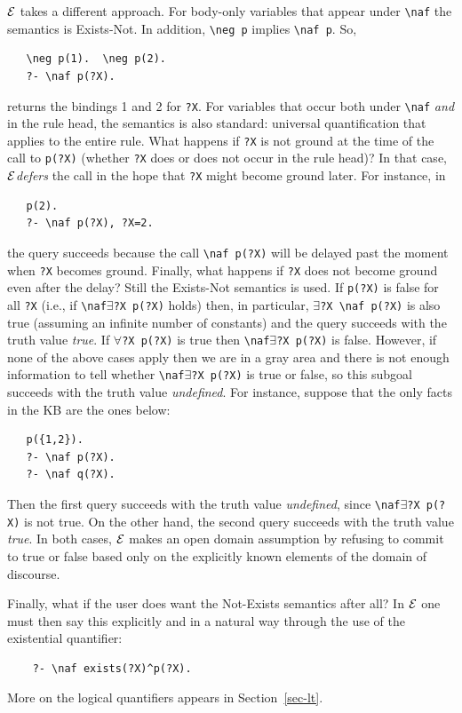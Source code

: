 \documentclass[11pt]{article}
\newcommand{\ERGO}{\mbox{\ensuremath{\cal{E}}\smaller{{\sc{RGO}}}}\xspace}
\newcommand{\FLSYSTEM}{\ERGO}
\newcommand{\bs}{\textbackslash}
\newcommand{\RULELOGNAF}{{\texttt{{\bs}naf}}\xspace}
\newcommand{\RULELOGNEG}{{\texttt{{\bs}neg}}\xspace}
\begin{document}
\FLSYSTEM takes a different approach. For body-only variables that appear
under \texttt{\RULELOGNAF} the semantics is Exists-Not. In addition, \texttt{\RULELOGNEG p}
implies \texttt{\RULELOGNAF p}. So,
\begin{verbatim}
   \neg p(1).  \neg p(2).
   ?- \naf p(?X).
\end{verbatim}
returns the bindings 1 and 2 for \texttt{?X}. For variables that occur both
under \texttt{\RULELOGNAF} \emph{and} in the rule head, the semantics is also standard:
universal quantification that applies to the entire rule.
What happens if \texttt{?X} is not ground at the time of the call to
\texttt{p(?X)} (whether \texttt{?X} does or does not occur in the rule head)?
In that case, \FLSYSTEM \emph{defers} the call in the hope that \texttt{?X}
might become ground later. For instance, in
\begin{verbatim}
   p(2).
   ?- \naf p(?X), ?X=2.
\end{verbatim}
the query succeeds because the call \texttt{\RULELOGNAF p(?X)} will be delayed past
the moment when \texttt{?X} becomes ground.   
Finally, what happens if \texttt{?X} does not become ground even after the
delay? Still the Exists-Not semantics is used. If \texttt{p(?X)} is false
for all \texttt{?X} (i.e., if \texttt{\RULELOGNAF $\exists$?X p(?X)} holds) then, in
particular, \texttt{$\exists$?X \RULELOGNAF p(?X)} is also true (assuming an
infinite number of constants) and the query
succeeds with the truth value \emph{true}.
If \texttt{$\forall$?X p(?X)} is true then \texttt{\RULELOGNAF $\exists$?X
  p(?X)}  is false.  
However, if none of the above cases apply then we are in a gray area
and there is not enough information to tell whether
\texttt{\RULELOGNAF $\exists$?X p(?X)} is true or false, so this subgoal
succeeds with the truth
value \emph{undefined}. For instance, suppose that the only facts in the KB
are the ones below:
\begin{verbatim}
   p({1,2}).
   ?- \naf p(?X).
   ?- \naf q(?X).
\end{verbatim}
Then the first query succeeds with the truth value \emph{undefined}, since
\texttt{\RULELOGNAF $\exists$?X p(?X)} is not true. On the other hand, the second
query succeeds with the truth value \emph{true}. 
In both cases, \FLSYSTEM makes an open domain assumption by refusing to commit
to true or false based only on the explicitly known elements of the domain
of discourse.

Finally, what if the user does want the Not-Exists semantics after all?
In \FLSYSTEM one must then say this explicitly and in a natural way through
the use of the existential quantifier:
\begin{verbatim}
    ?- \naf exists(?X)^p(?X).
\end{verbatim}
More on the logical quantifiers appears in Section~\ref{sec-lt}.
\end{document}
